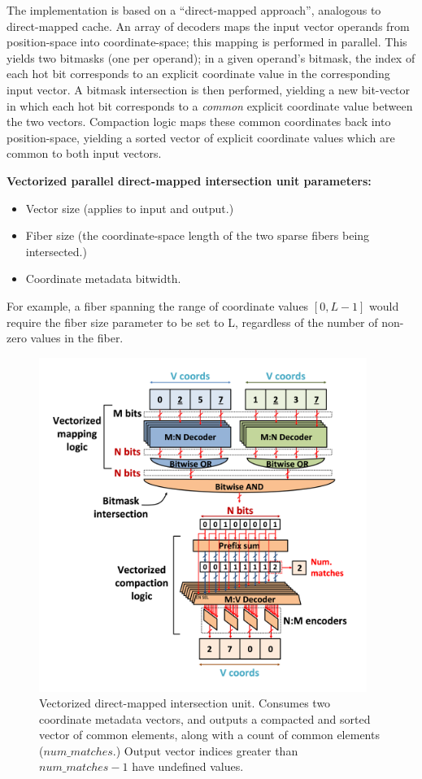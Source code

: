 The implementation is based on a ``direct-mapped approach'', analogous to direct-mapped cache. An array of decoders maps the input vector operands from position-space into coordinate-space; this mapping is performed in parallel. This yields two bitmasks (one per operand); in a given operand's bitmask, the index of each hot bit corresponds to an explicit coordinate value in the corresponding input vector. A bitmask intersection is then performed, yielding a new bit-vector in which each hot bit corresponds to a \textit{common} explicit coordinate value between the two vectors. Compaction logic maps these common coordinates back into position-space, yielding a sorted vector of explicit coordinate values which are common to both input vectors.

\textbf{Vectorized parallel direct-mapped intersection unit parameters:}

\begin{itemize}
    \item Vector size (applies to input and output.)
    \item Fiber size (the coordinate-space length of the two sparse fibers being intersected.)
    \item Coordinate metadata bitwidth.
\end{itemize}

For example, a fiber spanning the range of coordinate values $[0,L-1]$ would require the fiber size parameter to be set to L, regardless of the number of non-zero values in the fiber.

\begin{figure}[ht]
    \centering
    \includegraphics[width=0.95\textwidth]{figures/direct_mapped_isect.png}
    \caption{Vectorized direct-mapped intersection unit. Consumes two coordinate metadata vectors, and outputs a compacted and sorted vector of common elements, along with a count of common elements ($num\_matches$.) Output vector indices greater than $num\_matches - 1$ have undefined values.}
    \label{fig:direct_mapped_isect}
\end{figure}

